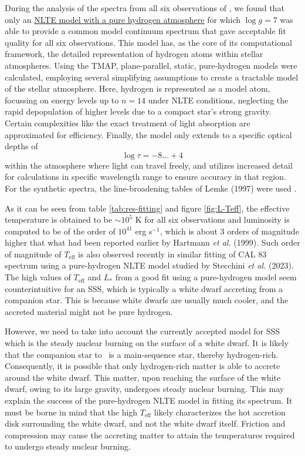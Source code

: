     During the analysis of the spectra from all six observations of \source, we found that only an %
    \href{http://astro.uni-tuebingen.de/~rauch/TMAF/flux_H.html}{NLTE model with a pure hydrogen atmosphere} for which $\log{g}=7$ was able to provide a common model continuum spectrum that gave acceptable fit quality for all six observations. This model has, as the core of its computational framework, the detailed representation of hydrogen atoms within stellar atmospheres. Using the TMAP,  plane-parallel, static, pure-hydrogen models were calculated, employing several simplifying assumptions to create a tractable model of the stellar atmosphere. Here, hydrogen is represented as a model atom, focussing on energy levels up to $n=14$ under NLTE conditions, neglecting the rapid depopulation of higher levels due to a compact star's strong gravity. Certain complexities like the exact treatment of light absorption are approximated for efficiency. Finally, the model only extends to a specific optical depths of
    $$\log{\tau}=-8\dots+4$$
    within the atmosphere where light can travel freely, and utilizes increased detail for calculations in specific wavelength range to ensure accuracy in that region. For the synthetic spectra, the line-broadening tables of Lemke (1997) were used \cite{lemke1997extended}.
    
    As it can be seen from table \ref{tab:res-fitting} and figure \ref{fig:L-Teff}, the effective temperature is obtained to be $\sim 10^5$ K for all six observations and luminosity is computed to be of the order of $10^{41}$ erg s$^{-1}$, which is about 3 orders of magnitude higher that what had been reported earlier by Hartmann \textit{et al.} (1999). %
    Such order of magnitude of $T_\text{eff}$ is also observed recently in similar fitting of CAL 83 spectrum using a pure-hydrogen NLTE model studied by Stecchini \textit{et al.} (2023). %
    The high values of $T_\text{eff}$ and $L_*$ from a good fit using a pure-hydrogen model seem counterintuitive for an SSS, which is typically a white dwarf accreting from a companion star. This is because white dwarfs are usually much cooler, and the accreted material might not be pure hydrogen.
    
    However, we need to take into account the currently accepted model for SSS which is the steady nuclear burning on the surface of a white dwarf. It is likely that the companion star to \source\ is a main-sequence star, thereby hydrogen-rich. Consequently, it is possible that only hydrogen-rich matter is able to accrete around the white dwarf. This matter, upon reaching the surface of the white dwarf, owing to its large gravity, undergoes steady nuclear burning. This may explain the success of the pure-hydrogen NLTE model in fitting its spectrum. It must be borne in mind that the high $T_\text{eff}$ likely characterizes the hot accretion disk surrounding the white dwarf, and not the white dwarf itself. Friction and compression may cause the accreting matter to attain the temperatures required to undergo steady nuclear burning.
    
